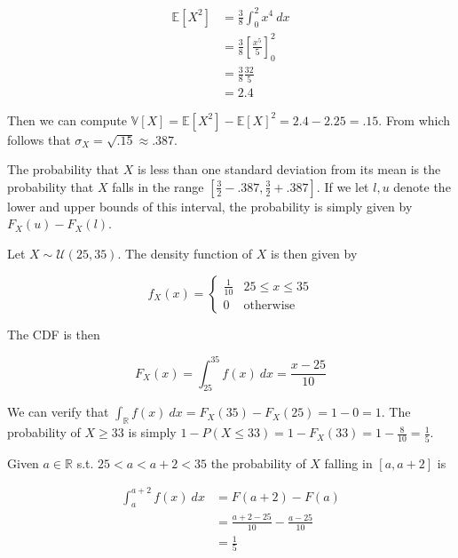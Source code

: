 \documentclass[a4paper, 12pt]{article}
\begin{document}
\begin{align*}
    \mathbb{E}\left[ X^2 \right] &= \frac{3}{8}\int_0^2 x^4 ~dx\\ 
                                 &= \frac{3}{8} \left[ \frac{x^5}{5} \right]_0^2 \\ 
                                 &=\frac{3}{8} \frac{32}{5} \\ 
                                 &= 2.4
\end{align*}

Then we can compute $\mathbb{V}\left[ X \right] = \mathbb{E}\left[ X^2 \right]
- \mathbb{E}\left[ X \right]^2 = 2.4 - 2.25 = .15  $. From which follows that
$\sigma_X = \sqrt{.15} \approx .387 $. 

The probability that $X$ is less than one standard deviation from its mean is
the probability that $X$ falls in the range $[\frac{3}{2}-.387, \frac{3}{2} +
.387]$. If we let $l, u$ denote the lower and upper bounds of this interval,
the probability is simply given by $F_X(u) - F_X(l)$.

\pagebreak 

Let $X \sim \mathcal{U}\left( 25, 35 \right) $. The density function of $X$
is then given by 

\begin{equation*}
    f_X(x) = \begin{cases}
        \frac{1}{10} & 25 \leq x \leq 35 \\ 
        0 & \text{otherwise}
    \end{cases}
\end{equation*}

The CDF is then 

\begin{equation*}
    F_X(x) = \int_{25}^{35} f(x) ~ dx = \frac{x-25}{10}
\end{equation*}

We can verify that $\int_{\mathbb{R}} f(x) ~ dx = F_X(35) - F_X(25) = 1 - 0  =
1$. The probability of $X \geq 33$ is simply $1 - P(X \leq 33) = 1 - F_X(33) =
1- \frac{8}{10} = \frac{1}{5}$.

Given $a \in \mathbb{R}$ s.t. $25 < a < a+2 < 35$ the probability of $X$
falling in $[a, a+2]$ is 

\begin{align*}
    \int_a^{a+2} f(x) ~ dx &= F(a + 2 ) - F(a) \\ 
                           &= \frac{a+2 - 25}{10} - \frac{a - 25}{10} \\ 
                           &=\frac{1}{5}
\end{align*}
\end{document}
